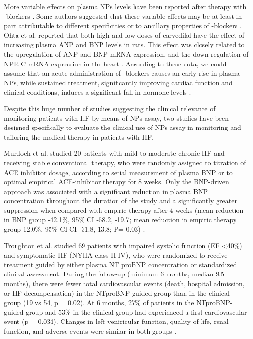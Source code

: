 \documentclass[14pt,a4paper,onecolumn]{extarticle}
\begin{document}
More variable effects on plasma NPs levels have been reported after therapy with \beta-blockers \citep{bib390} \citep{bib3278} \citep{bib3279} \citep{bib3280} \citep{bib3281} \citep{bib3282} \citep{bib3283} \citep{bib3284} \citep{bib3285} \citep{bib3286} \citep{bib3287} \citep{bib3288} \citep{bib3289} \citep{bib3290} \citep{bib3291} \citep{bib3292}. Some authors suggested that these variable effects may be at least in part attributable to different specificities or to ancillary properties of \beta-blockers \citep{bib362}. Ohta et al. \citep{bib3293} reported that both high and low doses of carvedilol have the effect of increasing plasma ANP and BNP levels in rats. This effect was closely related to the upregulation of ANP and BNP mRNA expression, and the down-regulation of NPR-C mRNA expression in the heart \citep{bib3293}. According to these data, we could assume that an acute administration of \beta-blockers causes an early rise in plasma NPs, while sustained treatment, significantly improving cardiac function and clinical conditions, induces a significant fall in hormone levels \citep{bib390} \citep{bib3284} \citep{bib3287} \citep{bib3289} \citep{bib3290}.

Despite this huge number of studies suggesting the clinical relevance of monitoring patients with HF by means of NPs assay, two studies \citep{bib3252} \citep{Troughton2000} have been designed specifically to evaluate the clinical use of NPs assay in monitoring and tailoring the medical therapy in patients with HF.

Murdoch et al. \citep{bib3252} studied 20 patients with mild to moderate chronic HF and receiving stable conventional therapy, who were randomly assigned to titration of ACE inhibitor dosage, according to serial measurement of plasma BNP or to optimal empirical ACE-inhibitor therapy for 8 weeks. Only the BNP-driven approach was associated with a significant reduction in plasma BNP concentration throughout the duration of the study and a significantly greater suppression when compared with empiric therapy after 4 weeks (mean reduction in BNP group -42.1\%, 95\% CI -58.2, -19.7; mean reduction in empiric therapy group  12.0\%, 95\% CI CI -31.8, 13.8; P= 0.03) \citep{bib3252}.

Troughton et al. studied 69 patients with impaired systolic function (EF <40\%) and symptomatic HF (NYHA class II-IV), who were randomized to receive treatment guided by either plasma NT proBNP concentration or standardized clinical assessment. During the follow-up (minimum 6 months, median 9.5 months), there were fewer total cardiovascular events (death, hospital admission, or HF decompensation) in the NTproBNP-guided group than in the clinical group (19 vs 54, p = 0.02). At 6 months, 27\% of patients in the NTproBNP-guided group and 53\% in the clinical group had experienced a first cardiovascular event (p = 0.034). Changes in left ventricular function, quality of life, renal function, and adverse events were similar in both groups \citep{Troughton2000}.
\end{document}
